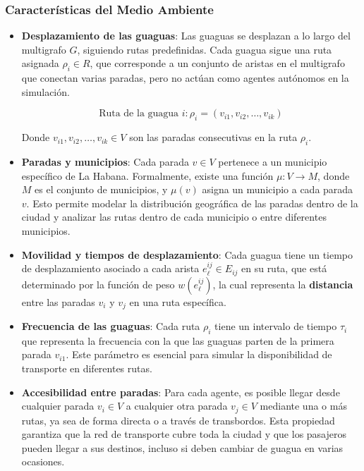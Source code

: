 \documentclass[a4paper,12pt]{article}
\begin{document}
\subsubsection{Características del Medio Ambiente}

\begin{itemize}
    \item \textbf{Desplazamiento de las guaguas}: Las guaguas se desplazan a lo largo del multigrafo $G$, siguiendo rutas predefinidas. Cada guagua sigue una ruta asignada $\rho_i \in R$, que corresponde a un conjunto de aristas en el multigrafo que conectan varias paradas, pero no actúan como agentes autónomos en la simulación.
    
    \[
    \text{Ruta de la guagua } i: \rho_i = (v_{i1}, v_{i2}, \dots, v_{ik})
    \]
    
    Donde $v_{i1}, v_{i2}, \dots, v_{ik} \in V$ son las paradas consecutivas en la ruta $\rho_i$.
    
    \item \textbf{Paradas y municipios}: Cada parada $v \in V$ pertenece a un municipio específico de La Habana. Formalmente, existe una función $\mu: V \rightarrow M$, donde $M$ es el conjunto de municipios, y $\mu(v)$ asigna un municipio a cada parada $v$. Esto permite modelar la distribución geográfica de las paradas dentro de la ciudad y analizar las rutas dentro de cada municipio o entre diferentes municipios.
    
    \item \textbf{Movilidad y tiempos de desplazamiento}: Cada guagua tiene un tiempo de desplazamiento asociado a cada arista $e_\ell^{ij} \in E_{ij}$ en su ruta, que está determinado por la función de peso $w(e_\ell^{ij})$, la cual representa la \textbf{distancia} entre las paradas $v_i$ y $v_j$ en una ruta específica.
    
    \item \textbf{Frecuencia de las guaguas}: Cada ruta $\rho_i$ tiene un intervalo de tiempo $\tau_i$ que representa la frecuencia con la que las guaguas parten de la primera parada $v_{i1}$. Este parámetro es esencial para simular la disponibilidad de transporte en diferentes rutas.

    \item \textbf{Accesibilidad entre paradas}: Para cada agente, es posible llegar desde cualquier parada $v_i \in V$ a cualquier otra parada $v_j \in V$ mediante una o más rutas, ya sea de forma directa o a través de transbordos. Esta propiedad garantiza que la red de transporte cubre toda la ciudad y que los pasajeros pueden llegar a sus destinos, incluso si deben cambiar de guagua en varias ocasiones.
    

\end{itemize}
\end{document}

